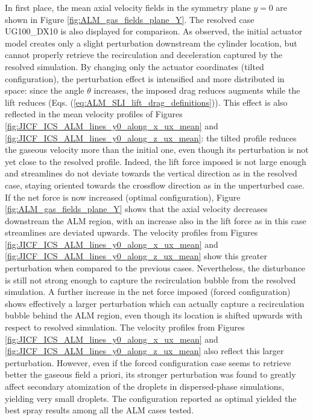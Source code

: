 In first place, the mean axial velocity fields in the symmetry plane $y = 0$ are shown in Figure \ref{fig:ALM_gas_fields_plane_Y}. The resolved case UG100\_DX10 is also displayed for comparison.  As observed, the initial actuator model creates only a slight perturbation downstream the cylinder location, but cannot properly retrieve the recirculation and deceleration captured by the resolved simulation. By changing only the actuator coordinates (tilted configuration), the perturbation effect is intensified and more distributed in space: since the angle $\theta$ increases, the imposed drag reduces augments while the lift reduces (Eqs. (\ref{eq:ALM_SLI_lift_drag_definitions})). This effect is also reflected in the mean velocity profiles of Figures \ref{fig:JICF_ICS_ALM_lines_y0_along_x_ux_mean} and \ref{fig:JICF_ICS_ALM_lines_y0_along_z_ux_mean}: the tilted profile reduces the gaseous velocity more than the initial one, even though its perturbation is not yet close to the resolved profile. Indeed, the lift force imposed is not large enough and streamlines do not deviate towards the vertical direction as in the resolved case, staying oriented towards the crossflow direction as in the unperturbed case. If the net force is now increased (optimal configuration),  Figure \ref{fig:ALM_gas_fields_plane_Y} shows that the axial velocity decreases downstream the ALM region, with an increase also in the lift force as in this case streamlines are deviated upwards. The velocity profiles from Figures \ref{fig:JICF_ICS_ALM_lines_y0_along_x_ux_mean} and \ref{fig:JICF_ICS_ALM_lines_y0_along_z_ux_mean} show this greater perturbation when compared to the previous cases. Nevertheless, the disturbance is still not strong enough to capture the recirculation bubble from the resolved simulation. A further increase in the net force imposed (forced configuration) shows effectively a larger perturbation which can actually capture a recirculation bubble behind the ALM region, even though its location is shifted upwards with respect to resolved simulation. The  velocity profiles from Figures \ref{fig:JICF_ICS_ALM_lines_y0_along_x_ux_mean} and \ref{fig:JICF_ICS_ALM_lines_y0_along_z_ux_mean} also reflect this larger perturbation. However, even if the forced configuration case seems to retrieve better the gaseous field a priori, its stronger perturbation was found to greatly affect secondary atomization of the droplets in dispersed-phase simulations, yielding very small droplets. The configuration reported as optimal yielded the best spray results among all the ALM cases tested. %







